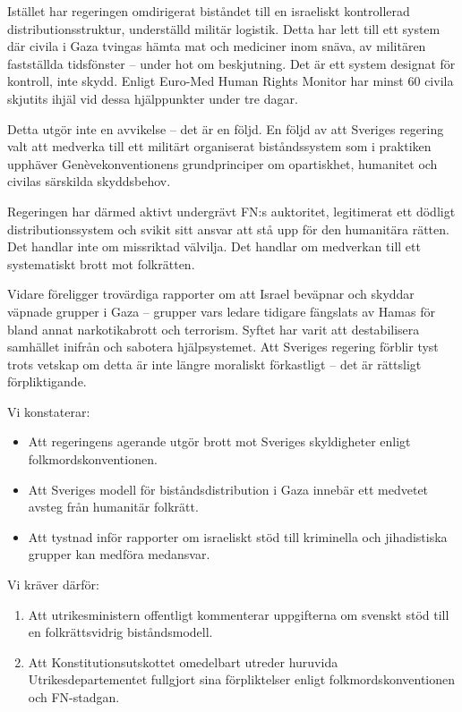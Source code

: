 \documentclass[12pt]{article}
\begin{document}
Istället har regeringen omdirigerat biståndet till en israeliskt kontrollerad distributionsstruktur, underställd militär logistik. Detta har lett till ett system där civila i Gaza tvingas hämta mat och mediciner inom snäva, av militären fastställda tidsfönster – under hot om beskjutning. Det är ett system designat för kontroll, inte skydd. Enligt Euro-Med Human Rights Monitor har minst 60 civila skjutits ihjäl vid dessa hjälppunkter under tre dagar.

Detta utgör inte en avvikelse – det är en följd. En följd av att Sveriges regering valt att medverka till ett militärt organiserat biståndssystem som i praktiken upphäver Genèvekonventionens grundprinciper om opartiskhet, humanitet och civilas särskilda skyddsbehov.

Regeringen har därmed aktivt undergrävt FN:s auktoritet, legitimerat ett dödligt distributionssystem och svikit sitt ansvar att stå upp för den humanitära rätten. Det handlar inte om missriktad välvilja. Det handlar om medverkan till ett systematiskt brott mot folkrätten.

Vidare föreligger trovärdiga rapporter om att Israel beväpnar och skyddar väpnade grupper i Gaza – grupper vars ledare tidigare fängslats av Hamas för bland annat narkotikabrott och terrorism. Syftet har varit att destabilisera samhället inifrån och sabotera hjälpsystemet. Att Sveriges regering förblir tyst trots vetskap om detta är inte längre moraliskt förkastligt – det är rättsligt förpliktigande.

Vi konstaterar:

\begin{itemize}
  \item Att regeringens agerande utgör brott mot Sveriges skyldigheter enligt folkmordskonventionen.
  \item Att Sveriges modell för biståndsdistribution i Gaza innebär ett medvetet avsteg från humanitär folkrätt.
  \item Att tystnad inför rapporter om israeliskt stöd till kriminella och jihadistiska grupper kan medföra medansvar.
\end{itemize}

Vi kräver därför:

\begin{enumerate}
  \item Att utrikesministern offentligt kommenterar uppgifterna om svenskt stöd till en folkrättsvidrig biståndsmodell.
  \item Att Konstitutionsutskottet omedelbart utreder huruvida Utrikesdepartementet fullgjort sina förpliktelser enligt folkmordskonventionen och FN-stadgan.
\end{enumerate}
\end{document}
